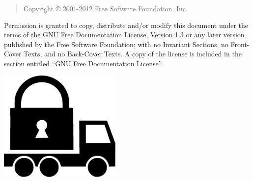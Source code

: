 \thispagestyle{empty}


\begin{quotation}
Copyright \copyright{} 2001-2012 Free Software Foundation, Inc.
\end{quotation}

\begin{flushleft}
Permission is granted to copy, distribute and/or modify this document
under the terms of the GNU Free Documentation License, Version 1.3 or
any later version published by the Free Software Foundation; with no
Invariant Sections, no Front-Cover Texts, and no Back-Cover Texts.  A
copy of the license is included in the section entitled ``GNU Free
Documentation License''.
\end{flushleft}

\newpage
\thispagestyle{empty}

\begin{center}
\includegraphics[width=6cm]{../gnutls-logo.pdf}
\end{center}

